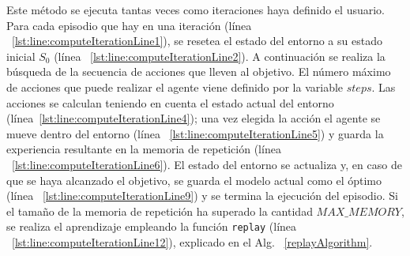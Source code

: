 \begin{enumerate}
Este método se ejecuta tantas veces como iteraciones haya definido el usuario. Para cada episodio que hay en una iteración (línea ~\ref{lst:line:computeIterationLine1}), se resetea el estado del entorno a su estado inicial $S_0$ (línea ~\ref{lst:line:computeIterationLine2}). A continuación se realiza la búsqueda de la secuencia de acciones que lleven al objetivo. El número máximo de acciones que puede realizar el agente viene definido por la variable $steps$. Las acciones se calculan teniendo en cuenta el estado actual del entorno (línea~\ref{lst:line:computeIterationLine4}); una vez elegida la acción el agente se mueve dentro del entorno (línea ~\ref{lst:line:computeIterationLine5}) y guarda la experiencia resultante en la memoria de repetición (línea ~\ref{lst:line:computeIterationLine6}). El estado del entorno se actualiza y, en caso de que se haya alcanzado el objetivo, se guarda el modelo actual como el óptimo (línea ~\ref{lst:line:computeIterationLine9}) y se termina la ejecución del episodio. Si el tamaño de la memoria de repetición ha superado la cantidad $MAX\_MEMORY$, se realiza el aprendizaje empleando la función \texttt{replay} (línea ~\ref{lst:line:computeIterationLine12}), explicado en el Alg. ~\ref{replayAlgorithm}. \\
\begin{algorithm}[H]
\SetAlgoLined
{}
\BlankLine
\For{\Episode \KwIn \Episodes}{\label{lst:line:computeIterationLine1}
    \State $\leftarrow$ \InitialState\;\label{lst:line:computeIterationLine2}
}
\end{algorithm}
\end{enumerate}

